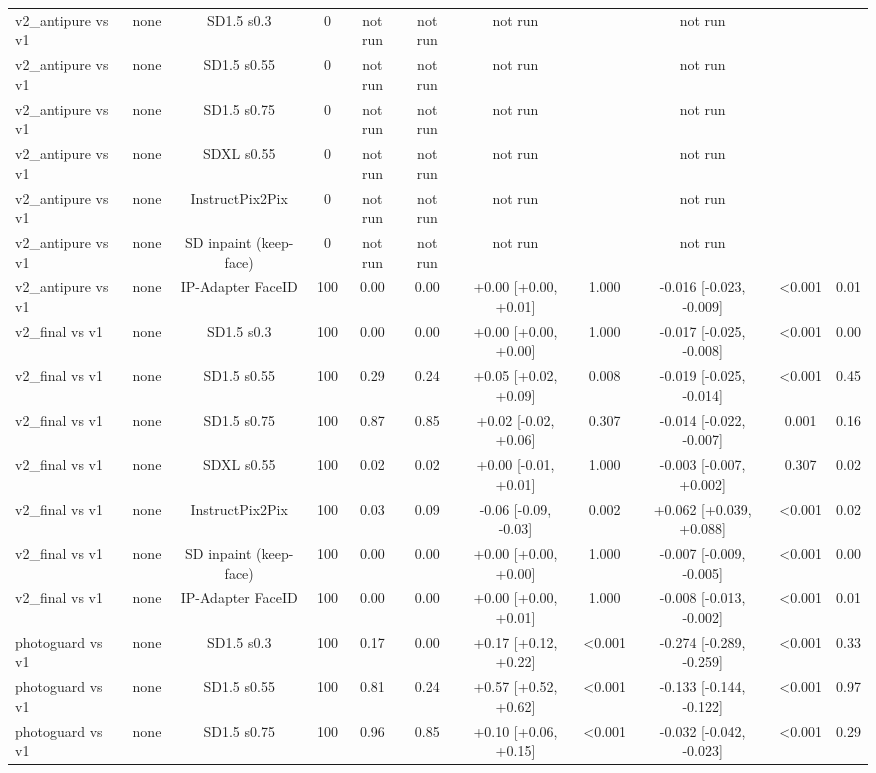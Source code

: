 \begin{table}[t]
{\begin{tabular}{lcccccccccc}
v2\_antipure vs v1 & none & SD1.5 s0.3 & 0 & not run & not run & not run &  & not run &  &  \\
v2\_antipure vs v1 & none & SD1.5 s0.55 & 0 & not run & not run & not run &  & not run &  &  \\
v2\_antipure vs v1 & none & SD1.5 s0.75 & 0 & not run & not run & not run &  & not run &  &  \\
v2\_antipure vs v1 & none & SDXL s0.55 & 0 & not run & not run & not run &  & not run &  &  \\
v2\_antipure vs v1 & none & InstructPix2Pix & 0 & not run & not run & not run &  & not run &  &  \\
v2\_antipure vs v1 & none & SD inpaint (keep-face) & 0 & not run & not run & not run &  & not run &  &  \\
v2\_antipure vs v1 & none & IP-Adapter FaceID & 100 & 0.00 & 0.00 & +0.00 [+0.00, +0.01] & 1.000 & -0.016 [-0.023, -0.009] & <0.001 & 0.01 \\
v2\_final vs v1 & none & SD1.5 s0.3 & 100 & 0.00 & 0.00 & +0.00 [+0.00, +0.00] & 1.000 & -0.017 [-0.025, -0.008] & <0.001 & 0.00 \\
v2\_final vs v1 & none & SD1.5 s0.55 & 100 & 0.29 & 0.24 & +0.05 [+0.02, +0.09] & 0.008 & -0.019 [-0.025, -0.014] & <0.001 & 0.45 \\
v2\_final vs v1 & none & SD1.5 s0.75 & 100 & 0.87 & 0.85 & +0.02 [-0.02, +0.06] & 0.307 & -0.014 [-0.022, -0.007] & 0.001 & 0.16 \\
v2\_final vs v1 & none & SDXL s0.55 & 100 & 0.02 & 0.02 & +0.00 [-0.01, +0.01] & 1.000 & -0.003 [-0.007, +0.002] & 0.307 & 0.02 \\
v2\_final vs v1 & none & InstructPix2Pix & 100 & 0.03 & 0.09 & -0.06 [-0.09, -0.03] & 0.002 & +0.062 [+0.039, +0.088] & <0.001 & 0.02 \\
v2\_final vs v1 & none & SD inpaint (keep-face) & 100 & 0.00 & 0.00 & +0.00 [+0.00, +0.00] & 1.000 & -0.007 [-0.009, -0.005] & <0.001 & 0.00 \\
v2\_final vs v1 & none & IP-Adapter FaceID & 100 & 0.00 & 0.00 & +0.00 [+0.00, +0.01] & 1.000 & -0.008 [-0.013, -0.002] & <0.001 & 0.01 \\
photoguard vs v1 & none & SD1.5 s0.3 & 100 & 0.17 & 0.00 & +0.17 [+0.12, +0.22] & <0.001 & -0.274 [-0.289, -0.259] & <0.001 & 0.33 \\
photoguard vs v1 & none & SD1.5 s0.55 & 100 & 0.81 & 0.24 & +0.57 [+0.52, +0.62] & <0.001 & -0.133 [-0.144, -0.122] & <0.001 & 0.97 \\
photoguard vs v1 & none & SD1.5 s0.75 & 100 & 0.96 & 0.85 & +0.10 [+0.06, +0.15] & <0.001 & -0.032 [-0.042, -0.023] & <0.001 & 0.29 \\

\end{tabular}}
\end{table}
